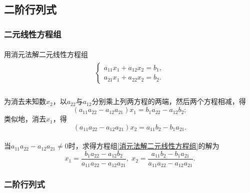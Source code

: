 \subsection{二阶行列式}
\subsubsection{二元线性方程组}
\paragraph{}
用消元法解二元线性方程组
\begin{align}
\label{消元法解二元线性方程组}
\begin{split}
  \left\{ \begin{array}{l}
    a_{11}x_1 + a_{12}x_2 = b_1, \\
    a_{21}x_1 + a_{22}x_2 = b_2.
  \end{array} \right.
\end{split}
\end{align}

\paragraph{}
为消去未知数$x_2$，以$a_{22}$与$a_{12}$分别乘上列两方程的两端，然后两个方程相减，得
\begin{equation*}
  (a_{11}a_{22} - a_{12}a_{21})x_1 = b_1a_{22} - a_{12}b_2;
\end{equation*}
类似地，消去$x_1$，得
\begin{equation*}
  (a_{11}a_{22} - a_{12}a_{21})x_2 = a_{11}b_2 - b_1a_{21}.
\end{equation*}

\paragraph{}
当$a_{11}a_{22} - a_{12}a_{21} \neq 0$时，求得方程组\eqref{消元法解二元线性方程组}的解为
\begin{equation}
  \label{二元线性方程组的解}
  x_1 = \frac{ b_1a_{22} - a_{12}b_2 }{ a_{11}a_{22} - a_{12}a_{21} }, \; x_2 = \frac{ a_{11}b_2 - b_1a_{21} }{ a_{11}a_{22} - a_{12}a_{21} }.
\end{equation}

\subsubsection{二阶行列式}
